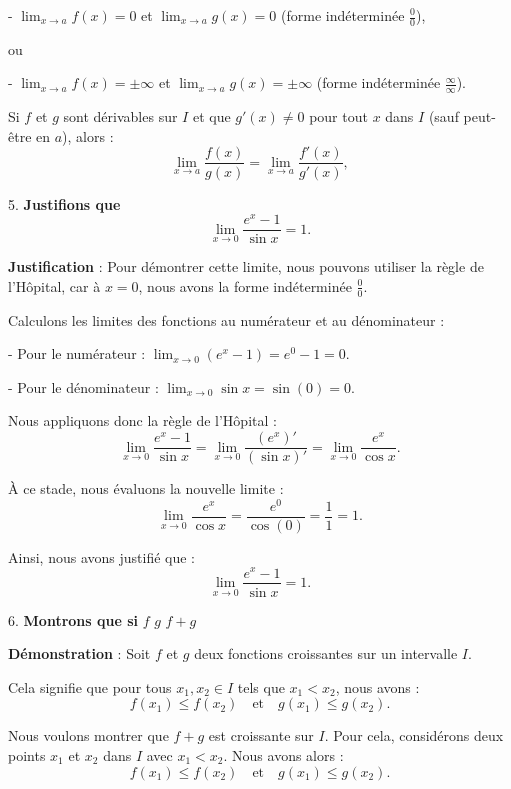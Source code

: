 \documentclass[12pt]{article}
\begin{document}
- \( \lim_{x \to a} f(x) = 0 \) et \( \lim_{x \to a} g(x) = 0 \) (forme indéterminée \( \frac{0}{0} \)), 

ou

- \( \lim_{x \to a} f(x) = \pm \infty \) et \( \lim_{x \to a} g(x) = \pm \infty \) (forme indéterminée \( \frac{\infty}{\infty} \)).

Si \( f \) et \( g \) sont dérivables sur \( I \) et que \( g'(x) \neq 0 \) pour tout \( x \) dans \( I \) (sauf peut-être en \( a \)), alors :
\[
\lim_{x \to a} \frac{f(x)}{g(x)} = \lim_{x \to a} \frac{f'(x)}{g'(x)},
\]

5. \textbf{Justifions que}
\[
\lim_{x \to 0} \frac{e^{x}-1}{\sin x} = 1.
\]

\textbf{Justification} : Pour démontrer cette limite, nous pouvons utiliser la règle de l'Hôpital, car à \( x = 0 \), nous avons la forme indéterminée \( \frac{0}{0} \).

Calculons les limites des fonctions au numérateur et au dénominateur :

- Pour le numérateur : \( \lim_{x \to 0} (e^{x} - 1) = e^{0} - 1 = 0 \).

- Pour le dénominateur : \( \lim_{x \to 0} \sin x = \sin(0) = 0 \).

Nous appliquons donc la règle de l'Hôpital :
\[
\lim_{x \to 0} \frac{e^{x}-1}{\sin x} = \lim_{x \to 0} \frac{(e^{x})'}{(\sin x)'} = \lim_{x \to 0} \frac{e^{x}}{\cos x}.
\]

À ce stade, nous évaluons la nouvelle limite :
\[
\lim_{x \to 0} \frac{e^{x}}{\cos x} = \frac{e^{0}}{\cos(0)} = \frac{1}{1} = 1.
\]

Ainsi, nous avons justifié que :
\[
\lim_{x \to 0} \frac{e^{x}-1}{\sin x} = 1.
\]

6. \textbf{Montrons que si } \( f \)  \( g \)  \( f + g \)\\ 

\textbf{Démonstration} : Soit \( f \) et \( g \) deux fonctions croissantes sur un intervalle \( I \).

Cela signifie que pour tous \( x_1, x_2 \in I \) tels que \( x_1 < x_2 \), nous avons :
\[
f(x_1) \leq f(x_2) \quad \text{et} \quad g(x_1) \leq g(x_2).
\]

Nous voulons montrer que \( f + g \) est croissante sur \( I \). Pour cela, considérons deux points \( x_1 \) et \( x_2 \) dans \( I \) avec \( x_1 < x_2 \). Nous avons alors :
\[
f(x_1) \leq f(x_2) \quad \text{et} \quad g(x_1) \leq g(x_2).
\]
\end{document}
